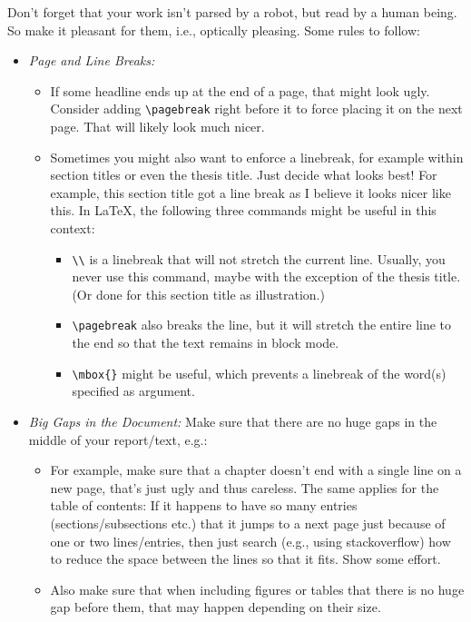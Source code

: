 Don't forget that your work isn't parsed by a robot, but read by a human being. So make it pleasant for them, i.e., optically pleasing. Some rules to follow:

\begin{itemize}
  \item \emph{Page and Line Breaks:} 
  \begin{itemize}
    \item If some headline ends up at the end of a page, that might look ugly. Consider adding \verb!\pagebreak! right before it to force placing it on the next page. That will likely look much nicer. 
    \item Sometimes you might also want to enforce a linebreak, for example within section titles or even the thesis title. Just decide what looks best! For example, this section title got a line break as I believe it looks nicer like this. In \LaTeX{}, the following three commands might be useful in this context:
    \begin{itemize}
      \item \verb!\\! is a linebreak that will not stretch the current line. Usually, you never use this command, maybe with the exception of the thesis title. (Or done for this section title as illustration.)
      \item \verb!\pagebreak! also breaks the line, but it will stretch the entire line to the end so that the text remains in block mode.
      \item \verb!\mbox{}! might be useful, which prevents a linebreak of the word(s) specified as argument.
    \end{itemize}
  \end{itemize}
  \item \emph{Big Gaps in the Document:} Make sure that there are no huge gaps in the middle of your report/text, e.g.:
  \begin{itemize}
    \item For example, make sure that a chapter doesn't end with a single line on a new page, that's just ugly and thus careless. The same applies for the table of contents: If it happens to have so many entries (sections/subsections etc.) that it jumps to a next page just because of one or two lines/entries, then just search (e.g., using stackoverflow) how to reduce the space between the lines so that it fits. Show some effort.
    \item Also make sure that when including figures or tables that there is no huge gap before them, that may happen depending on their size.

\end{itemize}
\end{itemize}
